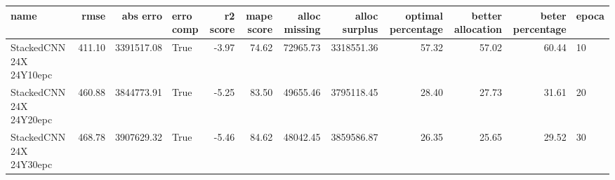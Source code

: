 \begin{tabular}{lrrlrrrrrrrl}
\toprule
name & rmse & abs erro & erro comp & r2 score & mape score & alloc missing & alloc surplus & optimal percentage & better allocation & beter percentage & epoca \\
\midrule
StackedCNN 24X 24Y10epc & 411.10 & 3391517.08 & True & -3.97 & 74.62 & 72965.73 & 3318551.36 & 57.32 & 57.02 & 60.44 & 10 \\
StackedCNN 24X 24Y20epc & 460.88 & 3844773.91 & True & -5.25 & 83.50 & 49655.46 & 3795118.45 & 28.40 & 27.73 & 31.61 & 20 \\
StackedCNN 24X 24Y30epc & 468.78 & 3907629.32 & True & -5.46 & 84.62 & 48042.45 & 3859586.87 & 26.35 & 25.65 & 29.52 & 30 \\
\bottomrule
\end{tabular}
